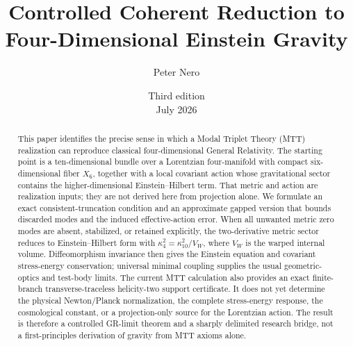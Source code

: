 \documentclass[11pt,a4paper]{article}
\title{\textbf{Controlled Coherent Reduction to\\
Four-Dimensional Einstein Gravity}}
\author{Peter Nero}
\date{Third edition\\July 2026}
\theoremstyle{definition}
\theoremstyle{remark}
\begin{document}
\maketitle

\begin{abstract}
This paper identifies the precise sense in which a Modal Triplet Theory (MTT)
realization can reproduce classical four-dimensional General Relativity.  The
starting point is a ten-dimensional bundle over a Lorentzian four-manifold
with compact six-dimensional fiber \(X_6\), together with a local covariant
action whose gravitational sector contains the higher-dimensional
Einstein--Hilbert term.  That metric and action are realization inputs; they
are not derived here from projection alone.  We formulate an exact
consistent-truncation condition and an approximate gapped version that bounds
discarded modes and the induced effective-action error.  When all unwanted
metric zero modes are absent, stabilized, or retained explicitly, the
two-derivative metric sector reduces to Einstein--Hilbert form with
\(\kappa_4^2=\kappa_{10}^2/V_W\), where \(V_W\) is the warped internal volume.
Diffeomorphism invariance then gives the Einstein equation and covariant
stress-energy conservation; universal minimal coupling supplies the usual
geometric-optics and test-body limits.  The current MTT calculation also
provides an exact finite-branch transverse-traceless helicity-two support
certificate.  It does not yet determine the physical Newton/Planck
normalization, the complete stress-energy response, the cosmological
constant, or a projection-only source for the Lorentzian action.  The result
is therefore a controlled GR-limit theorem and a sharply delimited research
bridge, not a first-principles derivation of gravity from MTT axioms alone.
\end{abstract}
\end{document}
